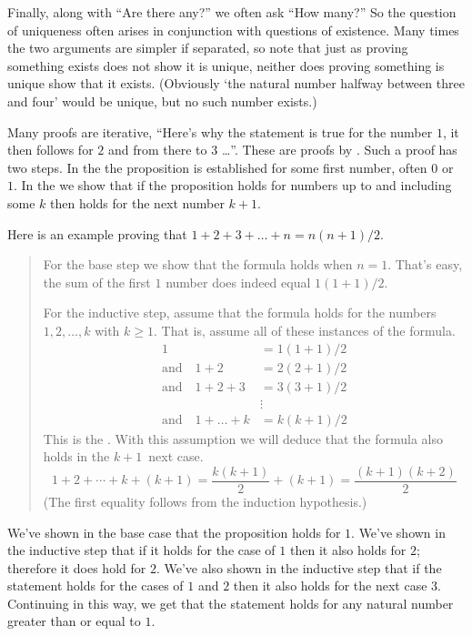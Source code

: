 Finally,
along with ``Are there any?'' %
we often ask ``How many?''
So the question of uniqueness often arises in conjunction
with questions of existence.
Many times the two arguments are simpler if separated, so note that just as
proving something exists does not show it is unique,
neither does proving something is unique show that it exists.
(Obviously `the natural number halfway between three and four' 
would be unique, but no such number exists.)











Many proofs are iterative,
``Here's why the statement is true for the number \( 1 \), 
it then follows for \( 2 \) and from there to \( 3 \) \ldots''.
These are proofs by .
Such a proof has two steps.
In the  
the proposition is established for some first
number, often \( 0 \) or~\( 1 \).
In the  
we show that if the proposition
holds for numbers up to and including some \( k \) 
then holds for the next number $k+1$.

Here is an example proving that \( 1+2+3+\dots+n=n(n+1)/2 \). 
\begin{quote}\small
For the base step we show that the formula holds when \( n=1 \).
That's easy, the sum of the first \( 1 \) number does indeed equal 
\( 1(1+1)/2 \).

For the inductive step, assume that the formula holds
for the numbers \( 1,2,\ldots,k \) with $k\geq 1$.
That is, assume all of these instances of the formula.
\begin{align*}
  1
  &=1(1+1)/2  \\
  \text{and}\quad 1+2
  &=2(2+1)/2  \\
  \text{and}\quad  1+2+3
  &=3(3+1)/2  \\
  &\vdots    \\
  \text{and}\quad 1+\dots+k
  &=k(k+1)/2
\end{align*}
This is the .
With this assumption we will deduce that 
the formula also holds in the \( k+1 \)~next case.
\begin{equation*}
  1+2+\cdots+k+(k+1)
  =
  \frac{k(k+1)}{2}+(k+1)
  =
  \frac{(k+1)(k+2)}{2}
\end{equation*}
(The first equality follows from the induction hypothesis.)
\end{quote}
We've shown in the base case that the proposition holds for \( 1 \).
We've shown in the inductive step 
that if it holds for the case of \( 1 \) then it also holds for \( 2 \);
therefore it does hold for $2$.
We've also shown in the inductive step that 
if the statement holds for the cases of \( 1 \) and \( 2 \) 
then it also holds for the next case \( 3 \).
Continuing in this way, we get that the statement holds
for any natural number greater than or equal to \( 1 \).


